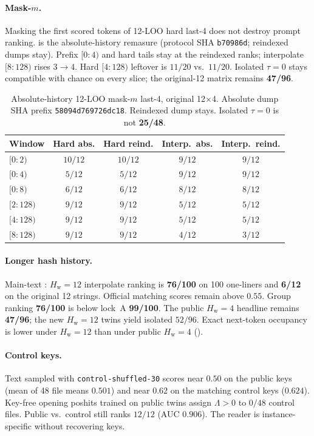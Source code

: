 \documentclass[11pt,a4paper]{article}
\theoremstyle{definition}
\newcommand{\LLR}{\Lambda}
\newcommand{\Hw}{H_{\mathrm{w}}}
\begin{document}
\paragraph{Mask-$m$.}
Masking the first scored tokens of 12-LOO hard last-4 does not destroy
prompt ranking.  is the absolute-history remasure
(protocol SHA \texttt{b70986d}; reindexed dumps stay). Prefix
$[0{:}4)$ and hard tails stay at the reindexed ranks; interpolate
$[8{:}128)$ rises $3\to 4$. Hard $[4{:}128)$ leftover is $11/20$ vs.\
$11/20$. Isolated $\tau=0$ stays compatible with chance on every slice; the
original-12 matrix remains \textbf{47/96}.

\begin{table}[ht]
\centering
\small
\caption{Absolute-history 12-LOO mask-$m$ last-4, original 12$\times$4.
Absolute dump SHA prefix \texttt{58094d769726dc18}. Reindexed dump stays.
Isolated $\tau=0$ is not \textbf{25/48}.}
\label{tab:maskabs}
\begin{tabular}{lcccc}
\toprule
Window & Hard abs. & Hard reind. & Interp.\ abs. & Interp.\ reind. \\
\midrule
$[0{:}2)$ & $10/12$ & $10/12$ & $9/12$ & $9/12$ \\
$[0{:}4)$ & $5/12$ & $5/12$ & $9/12$ & $9/12$ \\
$[0{:}8)$ & $6/12$ & $6/12$ & $8/12$ & $8/12$ \\
$[2{:}128)$ & $9/12$ & $9/12$ & $5/12$ & $5/12$ \\
$[4{:}128)$ & $9/12$ & $9/12$ & $5/12$ & $5/12$ \\
$[8{:}128)$ & $9/12$ & $9/12$ & $4/12$ & $3/12$ \\
\bottomrule
\end{tabular}
\end{table}

\paragraph{Longer hash history.}
Main-text : $\Hw=12$ interpolate ranking is
\textbf{76/100} on 100 one-liners and \textbf{6/12} on the original 12
strings. Official matching scores remain above $0.55$. Group ranking
\textbf{76/100} is below lock~A \textbf{99/100}. The public $\Hw=4$
headline remains \textbf{47/96}; the new $\Hw=12$ twins yield isolated
$52/96$. Exact next-token occupancy is lower under
$\Hw=12$ than under public $\Hw=4$ ().

\paragraph{Control keys.}
Text sampled with \texttt{control-shuffled-30} scores near $0.50$ on the
public keys (mean of 48 file means $0.501$) and near $0.62$ on the
matching control keys ($0.624$). Key-free opening poshits trained on
public twins assign $\LLR>0$ to $0/48$ control files. Public vs.\
control still ranks $12/12$ (AUC $0.906$). The reader is
instance-specific without recovering keys.

{\RaggedRight{}


}
\end{document}
